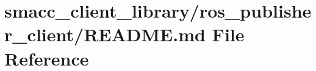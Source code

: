 \hypertarget{smacc__client__library_2ros__publisher__client_2README_8md}{}\section{smacc\+\_\+client\+\_\+library/ros\+\_\+publisher\+\_\+client/\+R\+E\+A\+D\+ME.md File Reference}
\label{smacc__client__library_2ros__publisher__client_2README_8md}

